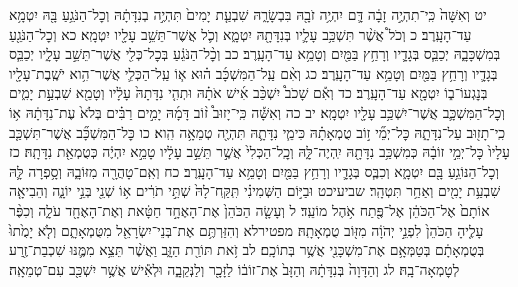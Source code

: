 \documentclass[twoside, openany, parskip=half, 11pt]{book}
\begin{document}
יט וְאִשָּׁה֙ כִּֽי־תִהְיֶ֣ה זָבָ֔ה דָּ֛ם יִהְיֶ֥ה זֹבָ֖הּ בִּבְשָׂרָ֑הּ שִׁבְעַ֤ת יָמִים֙ תִּהְיֶ֣ה בְנִדָּתָ֔הּ וְכׇל־הַנֹּגֵ֥עַ בָּ֖הּ יִטְמָ֥א עַד־הָעָֽרֶב׃ כ וְכֹל֩ אֲשֶׁ֨ר תִּשְׁכַּ֥ב עָלָ֛יו בְּנִדָּתָ֖הּ יִטְמָ֑א וְכֹ֛ל אֲשֶׁר־תֵּשֵׁ֥ב עָלָ֖יו יִטְמָֽא׃ כא וְכׇל־הַנֹּגֵ֖עַ בְּמִשְׁכָּבָ֑הּ יְכַבֵּ֧ס בְּגָדָ֛יו וְרָחַ֥ץ בַּמַּ֖יִם וְטָמֵ֥א עַד־הָעָֽרֶב׃ כב וְכׇ֨ל־הַנֹּגֵ֔עַ בְּכׇל־כְּלִ֖י אֲשֶׁר־תֵּשֵׁ֣ב עָלָ֑יו יְכַבֵּ֧ס בְּגָדָ֛יו וְרָחַ֥ץ בַּמַּ֖יִם וְטָמֵ֥א עַד־הָעָֽרֶב׃ כג וְאִ֨ם עַֽל־הַמִּשְׁכָּ֜ב ה֗וּא א֧וֹ עַֽל־הַכְּלִ֛י אֲשֶׁר־הִ֥וא יֹשֶֽׁבֶת־עָלָ֖יו בְּנׇגְעוֹ־ב֑וֹ יִטְמָ֖א עַד־הָעָֽרֶב׃ כד וְאִ֡ם שָׁכֹב֩ יִשְׁכַּ֨ב אִ֜ישׁ אֹתָ֗הּ וּתְהִ֤י נִדָּתָהּ֙ עָלָ֔יו וְטָמֵ֖א שִׁבְעַ֣ת יָמִ֑ים וְכׇל־הַמִּשְׁכָּ֛ב אֲשֶׁר־יִשְׁכַּ֥ב עָלָ֖יו יִטְמָֽא׃
יב כה וְאִשָּׁ֡ה כִּֽי־יָזוּב֩ ז֨וֹב דָּמָ֜הּ יָמִ֣ים רַבִּ֗ים בְּלֹא֙ עֶת־נִדָּתָ֔הּ א֥וֹ כִֽי־תָז֖וּב עַל־נִדָּתָ֑הּ כׇּל־יְמֵ֞י ז֣וֹב טֻמְאָתָ֗הּ כִּימֵ֧י נִדָּתָ֛הּ תִּהְיֶ֖ה טְמֵאָ֥ה הִֽוא׃ כו כׇּל־הַמִּשְׁכָּ֞ב אֲשֶׁר־תִּשְׁכַּ֤ב עָלָיו֙ כׇּל־יְמֵ֣י זוֹבָ֔הּ כְּמִשְׁכַּ֥ב נִדָּתָ֖הּ יִֽהְיֶה־לָּ֑הּ וְכׇֽל־הַכְּלִי֙ אֲשֶׁ֣ר תֵּשֵׁ֣ב עָלָ֔יו טָמֵ֣א יִהְיֶ֔ה כְּטֻמְאַ֖ת נִדָּתָֽהּ׃ כז וְכׇל־הַנּוֹגֵ֥עַ בָּ֖ם יִטְמָ֑א וְכִבֶּ֧ס בְּגָדָ֛יו וְרָחַ֥ץ בַּמַּ֖יִם וְטָמֵ֥א עַד־הָעָֽרֶב׃ כח וְאִֽם־טָהֲרָ֖ה מִזּוֹבָ֑הּ וְסָ֥פְרָה לָּ֛הּ שִׁבְעַ֥ת יָמִ֖ים וְאַחַ֥ר תִּטְהָֽר׃ שביעיכט וּבַיּ֣וֹם הַשְּׁמִינִ֗י תִּֽקַּֽח־לָהּ֙ שְׁתֵּ֣י תֹרִ֔ים א֥וֹ שְׁנֵ֖י בְּנֵ֣י יוֹנָ֑ה וְהֵבִיאָ֤ה אוֹתָם֙ אֶל־הַכֹּהֵ֔ן אֶל־פֶּ֖תַח אֹ֥הֶל מוֹעֵֽד׃ ל וְעָשָׂ֤ה הַכֹּהֵן֙ אֶת־הָאֶחָ֣ד חַטָּ֔את וְאֶת־הָאֶחָ֖ד עֹלָ֑ה וְכִפֶּ֨ר עָלֶ֤יהָ הַכֹּהֵן֙ לִפְנֵ֣י יְהֹוָ֔ה מִזּ֖וֹב טֻמְאָתָֽהּ׃ מפטירלא וְהִזַּרְתֶּ֥ם אֶת־בְּנֵי־יִשְׂרָאֵ֖ל מִטֻּמְאָתָ֑ם וְלֹ֤א יָמֻ֙תוּ֙ בְּטֻמְאָתָ֔ם בְּטַמְּאָ֥ם אֶת־מִשְׁכָּנִ֖י אֲשֶׁ֥ר בְּתוֹכָֽם׃ לב זֹ֥את תּוֹרַ֖ת הַזָּ֑ב וַאֲשֶׁ֨ר תֵּצֵ֥א מִמֶּ֛נּוּ שִׁכְבַת־זֶ֖רַע לְטׇמְאָה־בָֽהּ׃ לג וְהַדָּוָה֙ בְּנִדָּתָ֔הּ וְהַזָּב֙ אֶת־זוֹב֔וֹ לַזָּכָ֖ר וְלַנְּקֵבָ֑ה וּלְאִ֕ישׁ אֲשֶׁ֥ר יִשְׁכַּ֖ב עִם־טְמֵאָֽה׃
\end{document}
